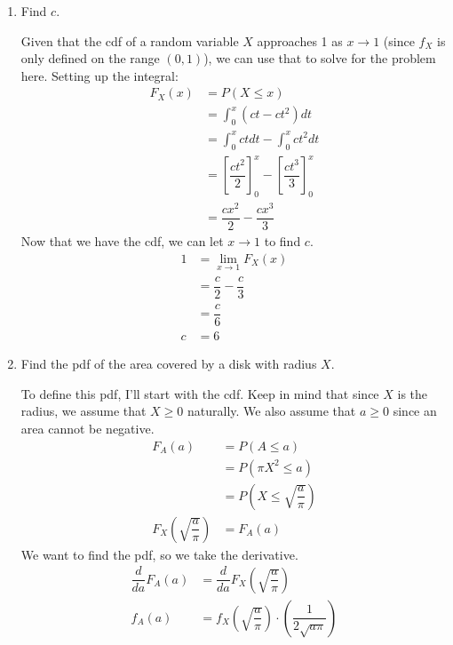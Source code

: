 \documentclass[11pt]{article}
\begin{document}
\begin{enumerate}[label=(\alph*)]
    \item Find $c$.
    \begin{solution}

        Given that the cdf of a random variable $X$ approaches 1 as $x \to 1$ (since $f_X$ is only defined on the range $(0, 1)$), we can use that to solve for the problem here.
        Setting up the integral:
        \begin{align*}
            F_X(x) &= P(X \leq x) \\
            &= \int_{0}^{x} (ct - ct^2)dt \\
            &= \int_{0}^{x} ct dt - \int_{0}^{x} ct^2 dt \\
            &= \left[\dfrac{ct^2}{2}\right]_{0}^{x} - \left[\dfrac{ct^3}{3}\right]_{0}^{x} \\
            &= \dfrac{cx^2}{2} - \dfrac{cx^3}{3}
        \end{align*}
        Now that we have the cdf, we can let $x \to 1$ to find $c$.
        \begin{align*}
            1 &= \lim_{x \to 1} F_X(x) \\
            &= \dfrac{c}{2} - \dfrac{c}{3} \\
            &= \dfrac{c}{6} \\
            c &= 6
        \end{align*}
    \end{solution}

    \vspace{3em}

    \item Find the pdf of the area covered by a disk with radius $X$.
    \begin{solution}

        To define this pdf, I'll start with the cdf.
        Keep in mind that since $X$ is the radius, we assume that $X \geq 0$ naturally.
        We also assume that $a \geq 0$ since an area cannot be negative.
        \begin{align*}
            F_A(a) &= P(A \leq a) \\
            &= P(\pi X^2 \leq a) \\
            &= P\left(X \leq \sqrt{\dfrac{a}{\pi}}\right) \\
            F_X\left(\sqrt{\dfrac{a}{\pi}}\right) &= F_A(a)
        \end{align*}
        We want to find the pdf, so we take the derivative.
        \begin{align*}
            \dfrac{d}{da} F_A(a) &= \dfrac{d}{da} F_X\left(\sqrt{\dfrac{a}{\pi}}\right) \\
            f_A(a) &= f_X\left(\sqrt{\dfrac{a}{\pi}}\right)\cdot\left(\dfrac{1}{2\sqrt{a\pi}}\right)
        \end{align*}


\end{solution}
\end{enumerate}
\end{document}

